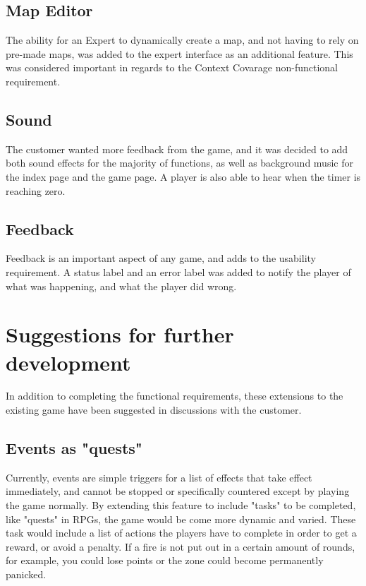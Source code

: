 \subsection{Map Editor}
The ability for an Expert to dynamically create a map, and not having to rely on pre-made maps, was added to the expert interface as an additional feature. This was considered important in regards to the Context Covarage non-functional requirement.\\

\subsection{Sound}
The customer wanted more feedback from the game, and it was decided to add both sound effects for the majority of functions, as well as background music for the index page and the game page. A player is also able to hear when the timer is reaching zero.\\

\subsection{Feedback}
Feedback is an important aspect of any game, and adds to the usability requirement. A status label and an error label was added to notify the player of what was happening, and what the player did wrong. 


\section{Suggestions for further development}

In addition to completing the functional requirements, these extensions to the existing game have been suggested in discussions with the customer.\\

\subsection{Events as "quests"}
Currently, events are simple triggers for a list of effects that take effect immediately, and cannot be stopped or specifically countered except by playing the game normally. By extending this feature to include "tasks" to be completed, like "quests" in RPGs, the game would be come more dynamic and varied. These task would include a list of actions the players have to complete in order to get a reward, or avoid a penalty. If a fire is not put out in a certain amount of rounds, for example, you could lose points or the zone could become permanently panicked.\\

